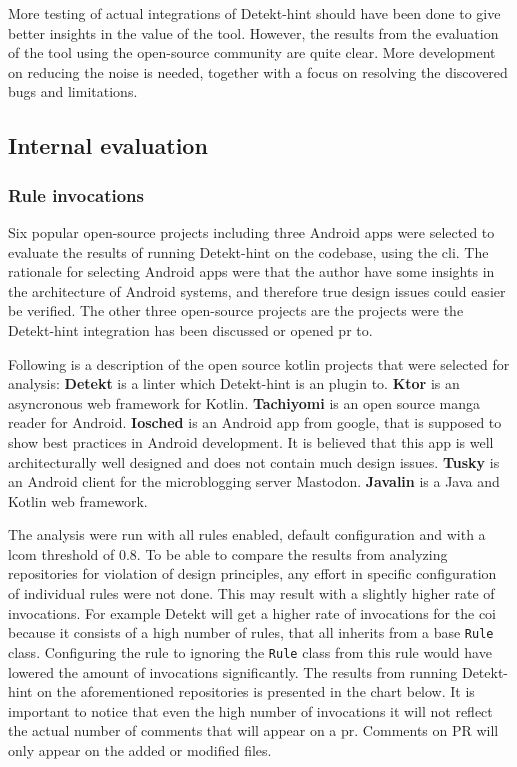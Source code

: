 \documentclass{report}
\begin{document}
More testing of actual integrations of Detekt-hint should have been done to give better insights in the value of the tool. However, the results from the evaluation of the tool using the open-source community are quite clear. More development on reducing the noise is needed, together with a focus on resolving the discovered bugs and limitations.
 
\subsection{Internal evaluation}
\label{evaluation-internal}
\subsubsection{Rule invocations}
Six popular open-source projects including three Android apps were selected to evaluate the results of running Detekt-hint on the codebase, using the \gls{cli}. The rationale for selecting Android apps were that the author have some insights in the architecture of Android systems, and therefore true design issues could easier be verified. The other three open-source projects are the projects were the Detekt-hint integration has been discussed or opened \gls{pr} to. 


Following is a description of the open source kotlin projects that were selected for analysis: \textbf{Detekt} is a linter which Detekt-hint is an plugin to. \textbf{Ktor} is an asyncronous web framework for Kotlin. \textbf{Tachiyomi} is an open source manga reader for Android. \textbf{Iosched} is an Android app from google, that is supposed to show best practices in Android development. It is believed that this app is well architecturally well designed and does not contain much design issues. \textbf{Tusky} is an Android client for the microblogging server Mastodon. \textbf{Javalin} is a Java and Kotlin web framework. 



The analysis were run with all rules enabled, default configuration and with a \gls{lcom} threshold of 0.8. To be able to compare the results from analyzing repositories for violation of design principles, any effort in specific configuration of individual rules were not done. This may result with a slightly higher rate of invocations. For example Detekt will get a higher rate of invocations for the \gls{coi} because it consists of a high number of rules, that all inherits from a base \texttt{Rule} class. Configuring the rule to ignoring the \texttt{Rule} class from this rule would have lowered the amount of invocations significantly. The results from running Detekt-hint on the aforementioned repositories is presented in the chart below. It is important to notice that even the high number of invocations it will not reflect the actual number of comments that will appear on a \gls{pr}. Comments on PR will only appear on the added or modified files.
\end{document}
